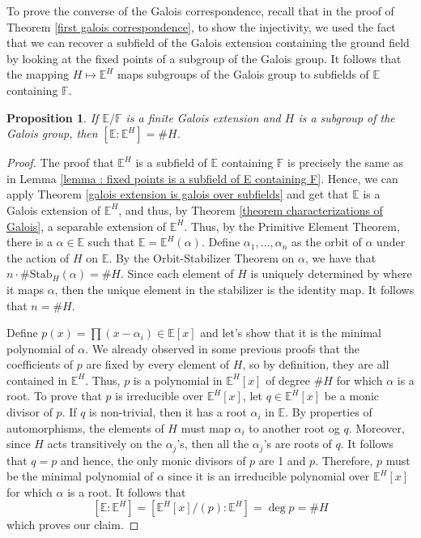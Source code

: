 \documentclass{article}
\theoremstyle{plain}
\newtheorem{proposition}[theorem]{Proposition}
\theoremstyle{definition}
\newcommand{\F}{\mathbb{F}}
\newcommand{\E}{\mathbb{E}}
\begin{document}
To prove the converse of the Galois correspondence, recall that in the proof of Theorem \ref{first galois correspondence}, to show the injectivity, we used the fact that we can recover a subfield of the Galois extension containing the ground field by looking at the fixed points of a subgroup of the Galois group. It follows that the mapping $H \mapsto \E^H$ maps subgroups of the Galois group to subfields of $\E$ containing $\F$. 

\begin{proposition}
    If $\E / \F$ is a finite Galois extension and $H$ is a subgroup of the Galois group, then $[\E : \E^H] = \# H$.
\end{proposition}

\begin{proof}
    The proof that $\E^H$ is a subfield of $\E$ containing $\F$ is precisely the same as in Lemma \ref{lemma : fixed points is a subfield of E containing F}. Hence, we can apply Theorem \ref{galois extension is galois over subfields} and get that $\E$ is a Galois extension of $\E^H$, and thus, by Theorem \ref{theorem characterizations of Galois}, a separable extension of $\E^H$. Thus, by the Primitive Element Theorem, there is a $\alpha \in \E$ such that $\E = \E^H(\alpha)$. Define $\alpha_1, ..., \alpha_n$ as the orbit of $\alpha$ under the action of $H$ on $\E$. By the Orbit-Stabilizer Theorem on $\alpha$, we have that $n \cdot \#\text{Stab}_H(\alpha) = \# H$. Since each element of $H$ is uniquely determined by where it maps $\alpha$, then the unique element in the stabilizer is the identity map. It follows that $n = \# H$.

    Define $p(x) = \prod (x - \alpha_i) \in \E[x]$ and let's show that it is the minimal polynomial of $\alpha$. We already observed in some previous proofs that the coefficients of $p$ are fixed by every element of $H$, so by definition, they are all contained in $\E^H$. Thus, $p$ is a polynomial in $\E^H[x]$ of degree $\# H$ for which $\alpha$ is a root. To prove that $p$ is irreducible over $\E^H[x]$, let $q \in \E^H[x]$ be a monic divisor of $p$. If $q$ is non-trivial, then it has a root $\alpha_i$ in $\E$. By properties of automorphisms, the elements of $H$ must map $\alpha_i$ to another root og $q$. Moreover, since $H$ acts transitively on the $\alpha_j$'s, then all the $\alpha_j$'s are roots of $q$. It follows that $q = p$ and hence, the only monic divisors of $p$ are 1 and $p$. Therefore, $p$ must be the minimal polynomial of $\alpha$ since it is an irreducible polynomial over $\E^H[x]$ for which $\alpha$ is a root. It follows that
    $$[\E : \E^H] = [\E^H[x]/(p) : \E^H] = \deg p = \# H$$
    which proves our claim. 
\end{proof}
\end{document}
